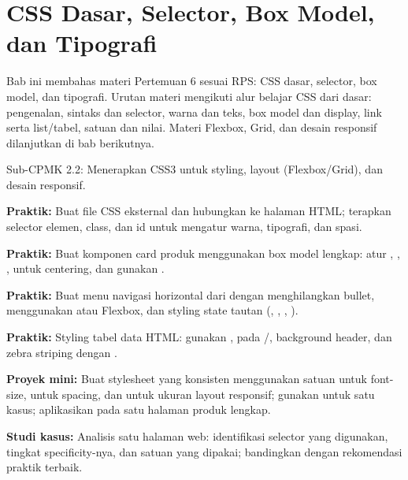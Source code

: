 \documentclass[../main.tex]{subfiles}
\begin{document}
\chapter{CSS Dasar, Selector, Box Model, dan Tipografi}

Bab ini membahas materi Pertemuan 6 sesuai RPS: CSS dasar, selector, box model, dan tipografi. Urutan materi mengikuti alur belajar CSS dari dasar: pengenalan, sintaks dan selector, warna dan teks, box model dan display, link serta list/tabel, satuan dan nilai. Materi Flexbox, Grid, dan desain responsif dilanjutkan di bab berikutnya.

\begin{subcpmk}
  \item Sub-CPMK 2.2: Menerapkan CSS3 untuk styling, layout (Flexbox/Grid), dan desain responsif.
\end{subcpmk}














\begin{aktivitas}
  \item \textbf{Praktik:} Buat file CSS eksternal dan hubungkan ke halaman HTML; terapkan selector elemen, class, dan id untuk mengatur warna, tipografi, dan spasi.
  \item \textbf{Praktik:} Buat komponen card produk menggunakan box model lengkap: atur , , ,  untuk centering, dan gunakan .
  \item \textbf{Praktik:} Buat menu navigasi horizontal dari  dengan menghilangkan bullet, menggunakan  atau Flexbox, dan styling state tautan (, , , ).
  \item \textbf{Praktik:} Styling tabel data HTML: gunakan ,  pada /, background header, dan zebra striping dengan .
  \item \textbf{Proyek mini:} Buat stylesheet yang konsisten menggunakan satuan  untuk font-size,  untuk spacing, dan \code{\%} untuk ukuran layout responsif; gunakan  untuk satu kasus; aplikasikan pada satu halaman produk lengkap.
  \item \textbf{Studi kasus:} Analisis satu halaman web: identifikasi selector yang digunakan, tingkat specificity-nya, dan satuan yang dipakai; bandingkan dengan rekomendasi praktik terbaik.
\end{aktivitas}
\end{document}
